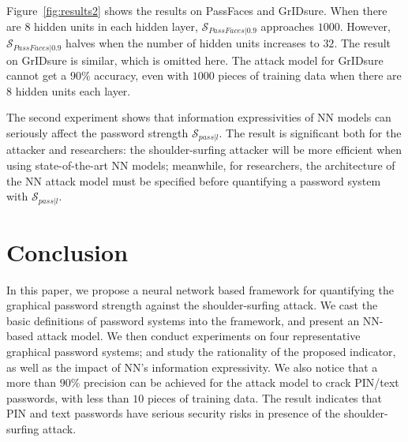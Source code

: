 \documentclass{article}
\begin{document}
Figure~\ref{fig:results2} shows the results on PassFaces and GrIDsure. When there are $8$ hidden units in each hidden layer, $\mathcal{S}_{PassFaces|0.9}$ approaches $1000$. However, $\mathcal{S}_{PassFaces|0.9}$ halves when the number of hidden units increases to $32$. The result on GrIDsure is similar, which is omitted here. The attack model for GrIDsure cannot get a $90\%$ accuracy, even with $1000$ pieces of training data when there are $8$ hidden units each layer.

The second experiment shows that information expressivities of NN models can seriously affect the password strength $\mathcal{S}_{pass|l}$.
The result is significant both for the attacker and researchers: the shoulder-surfing attacker will be more efficient when using state-of-the-art NN models; meanwhile, for researchers, the architecture of the NN attack model must be specified before quantifying a password system with $\mathcal{S}_{pass|l}$.


\section{Conclusion} \label{sec:conclusion}
In this paper, we propose a neural network based framework for quantifying the graphical password strength against the shoulder-surfing attack. We cast the basic definitions of password systems into the framework, and present an NN-based attack model. We then conduct experiments on four representative graphical password systems; and study the rationality of the proposed indicator, as well as the impact of NN's information expressivity. We also notice that a more than $90\%$ precision can be achieved for the attack model to crack PIN/text passwords, with less than $10$ pieces of training data.  The result indicates that PIN and text passwords have serious security risks in presence of the shoulder-surfing attack. 


\end{document}
